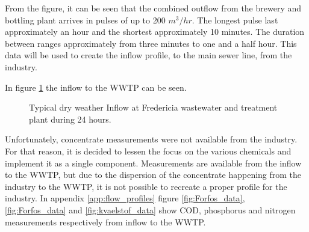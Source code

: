 From the figure, it can be seen that the combined outflow from the brewery and bottling plant arrives in pulses of up to 200 $m^3/hr$. The longest pulse last approximately an hour and the shortest approximately 10 minutes. The duration between ranges approximately from three minutes to one and a half hour. 
This data will be used to create the inflow profile, to the main sewer line, from the industry.     

In figure \ref{fig:flow_input_wwtp} the inflow to the WWTP can be seen.
\begin{figure}[H]
\centering

\caption{Typical dry weather Inflow at Fredericia wastewater and treatment plant during 24 hours.}
\label{fig:flow_input_wwtp}
\end{figure}  

Unfortunately, concentrate measurements were not available from the industry. For that reason, it is decided to lessen the focus on the various chemicals and implement it as a single component. Measurements are available from the inflow to the WWTP, but due to the dispersion of the concentrate happening from the industry to the WWTP, it is not possible to recreate a proper profile for the industry. 
In appendix \ref{app:flow_profiles} figure \ref{fig:Forfos_data}, \ref{fig:Forfos_data} and \ref{fig:kvaelstof_data} show COD, phosphorus and nitrogen measurements respectively from inflow to the WWTP. 




   